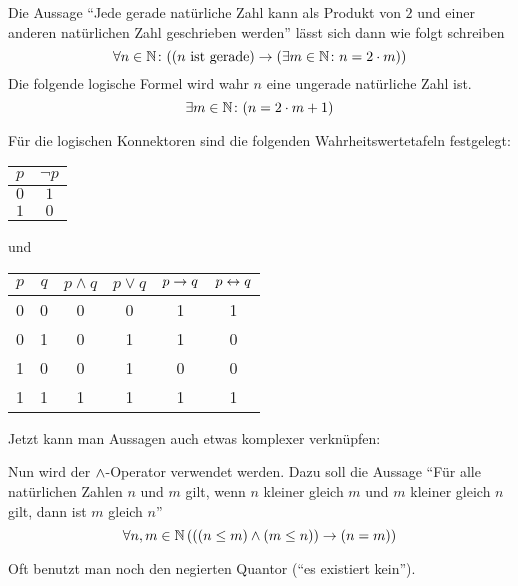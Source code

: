 \begin{example}
Die Aussage "`Jede gerade natürliche Zahl kann als Produkt von $2$ und einer
anderen natürlichen Zahl geschrieben werden"' lässt sich dann wie
folgt schreiben
\begin{displaymath}
\forall n \in \mathbb N \colon ((n \text{ ist gerade}) \rightarrow (\exists m
\in \mathbb N \colon n = 2 \cdot m)) 
\end{displaymath}
Die folgende logische Formel wird wahr \gdw $n$ eine ungerade
natürliche Zahl ist.
\begin{displaymath}
\exists m \in \mathbb N \colon (n = 2 \cdot m + 1)
\end{displaymath}
\end{example}
Für die logischen Konnektoren sind die folgenden Wahrheitswertetafeln
festgelegt:

\begin{center}
\begin{tabular}{c||c}
$p$ & $\neg p$\\
\hline
$0$ & $1$\\
$1$ & $0$
\end{tabular}
\hspace*{5em}
und
\hspace*{5em}
\begin{tabular}{c|c||c|c|c|c}
$p$ & $q$ & $p \wedge q$ & $p \vee q$ & $p \rightarrow q$ & $p \leftrightarrow q$\\
\hline
0 & 0 & 0 & 0 & 1 & 1\\   
0 & 1 & 0 & 1 & 1 & 0\\
1 & 0 & 0 & 1 & 0 & 0\\ 
1 & 1 & 1 & 1 & 1 & 1
\end{tabular}
\end{center}
\goodbreak
\noindent Jetzt kann man Aussagen auch etwas komplexer verknüpfen:
\begin{example}
Nun wird der $\wedge$-Operator verwendet werden. Dazu soll die Aussage 
"`Für alle natürlichen Zahlen $n$ und $m$ gilt, wenn $n$ kleiner
gleich $m$ und $m$ kleiner gleich $n$ gilt, dann ist $m$ gleich $n$"'
\begin{displaymath}
\forall n,m \in \mathbb N\, (((n \le m) \wedge (m \le n)) \rightarrow (n = m))
\end{displaymath}
\end{example}
Oft benutzt man noch den negierten Quantor \dindex{$\nexists$} ("`es existiert kein"').

